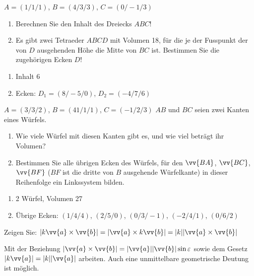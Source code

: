 \begin{exercisesKapitel}

\begin{exercise}
$A=(1/1/1)$, $B=(4/3/3)$, $C=(0/-1/3)$ 
\begin{enumerate}
\item Berechnen Sie den Inhalt des Dreiecks $ABC$!
\item Es gibt zwei Tetraeder $ABCD$ mit Volumen 18, für die je der Fusspunkt der von $D$ ausgehenden Höhe die Mitte von $BC$ ist. Bestimmen Sie die zugehörigen Ecken $D$!
\end{enumerate}
\begin{answer}
\begin{enumerate}
\item Inhalt 6
\item Ecken: $D_{1} = (8/-5/0)$, $D_{2}=(-4/7/6)$
\end{enumerate}
\end{answer}
\end{exercise}


\begin{exercise}
$A=(3/3/2)$, $B=(41/1/1)$, $C=(-1/2/3)$ \newline
$AB$ und $BC$ seien zwei Kanten eines Würfels.
\begin{enumerate}
\item Wie viele Würfel mit diesen Kanten gibt es, und wie viel beträgt ihr Volumen?
\item Bestimmen Sie alle übrigen Ecken des Würfels, für den $\vv{BA}$, $\vv{BC}$, $\vv{BF}$ ($BF$ ist die dritte von $B$ ausgehende Würfelkante) in dieser Reihenfolge ein Linkssystem bilden.
\end{enumerate}
\begin{answer}
\begin{enumerate}
\item 2 Würfel, Volumen 27
\item Übrige Ecken: $(1/4/4)$, $(2/5/0)$, $(0/3/-1)$, $(-2/4/1)$, $(0/6/2)$
\end{enumerate}
\end{answer}
\end{exercise}

\begin{exercise}
Zeigen Sie: $ |k \vv{a} \times \vv{b} | = | \vv{a} \times k \vv{b}| = |k| |\vv{a} \times \vv{b} | $
\begin{answer}
Mit der Beziehung $|\vv{a} \times \vv{b} | = |\vv{a} | |\vv{b}| \sin{\epsilon}$ sowie dem Gesetz $| k \vv{a} | = |k | |\vv{a} |$ arbeiten. Auch eine unmittelbare geometrische Deutung ist möglich.
\end{answer}
\end{exercise}


\end{exercisesKapitel}
